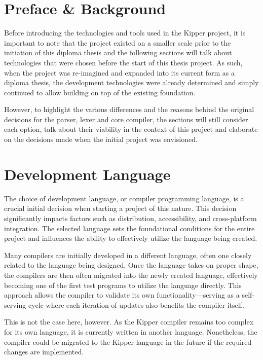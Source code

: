\section{Preface \& Background}

Before introducing the technologies and tools used in the Kipper project, it is important to note that the project existed on a smaller scale prior to the initiation of this diploma thesis and the following sections will talk about technologies that were chosen before the start of this thesis project. As such, when the project was re-imagined and expanded into its current form as a diploma thesis, the development technologies were already determined and simply continued to allow building on top of the existing foundation.

However, to highlight the various differences and the reasons behind the original decisions for the parser, lexer and core compiler, the sections will still consider each option, talk about their viability in the context of this project and elaborate on the decisions made when the initial project was envisioned.

\section{Development Language}

The choice of development language, or compiler programming language, is a crucial initial decision when starting a project of this nature. This decision significantly impacts factors such as distribution, accessibility, and cross-platform integration. The selected language sets the foundational conditions for the entire project and influences the ability to effectively utilize the language being created.

Many compilers are initially developed in a different language, often one closely related to the language being designed. Once the language takes on proper shape, the compilers are then often migrated into the newly created language, effectively becoming one of the first test programs to utilize the language directly. This approach allows the compiler to validate its own functionality—serving as a self-serving cycle where each iteration of updates also benefits the compiler itself.

This is not the case here, however. As the Kipper compiler remains too complex for its own language, it is currently written in another language. Nonetheless, the compiler could be migrated to the Kipper language in the future if the required changes are implemented.

